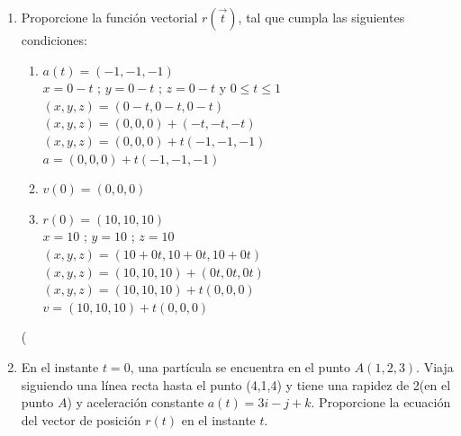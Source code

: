 \documentclass[10pt,letterpaper,fleqn]{article}
\begin{document}
\begin{enumerate}
        \item Proporcione la función vectorial $r(\overrightarrow{t})$, tal que cumpla las siguientes condiciones:
        \begin{enumerate}
            \item $a(t)=(-1,-1,-1)$ \\
            $x = 0-t$ ; $y = 0-t$ ; $ z = 0-t$ y $0 \leqslant t \leqslant 1$\\
            $(x,y,z)=(0-t,0-t,0-t)$ \\
            $(x,y,z)=(0,0,0)+(-t,-t,-t)$ \\
            $(x,y,z)=(0,0,0)+t(-1,-1,-1)$ \\
            $a=(0,0,0)+t(-1,-1,-1)$ 
            \item $v(0)=(0,0,0)$

            \item $r(0)=(10,10,10)$ \\
            $x=10$ ; $y=10$ ; $z=10$ \\
            $(x,y,z) = (10+0t,10+0t,10+0t)$ \\
            $(x,y,z) = (10,10,10)+(0t,0t,0t)$ \\
            $(x,y,z) = (10,10,10)+t(0,0,0)$ \\ 
            $v = (10,10,10)+t(0,0,0)$

        \end{enumerate}
(
        \item En el instante $t = 0$, una partícula se encuentra en el punto $A(1,2,3)$. Viaja siguiendo una línea recta
        hasta el punto (4,1,4) y tiene una rapidez de 2(en el punto $A$) y aceleración constante $a(t) = 3i - j + k$.
        Proporcione la ecuación del vector de posición $r(t)$ en el instante $t$.


\end{enumerate}
\end{document}
